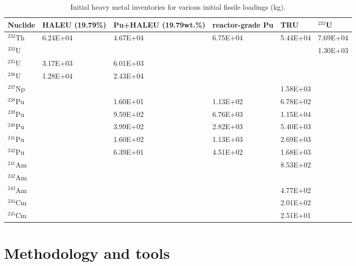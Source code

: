 \begin{table}  %
	\caption{Initial heavy metal inventories for 
	various initial fissile loadings (kg).}
	\vspace{0.1in}
	\begin{tabularx}{\textwidth}{X X p{} 
	p{} X X}
		\hline
		Nuclide & \gls{HALEU} (19.79\%) & Pu+\gls{HALEU} (19.79wt.\%) &  
		reactor-grade Pu & \gls{TRU}& $^{233}$U \\	\hline
		$^{232}$Th       &6.24E+04 & 4.67E+04 &   6.75E+04			& 5.44E+04	& 7.69E+04    \\ 
		$^{233}$U        &         & &        &       &  1.30E+03 \\
		$^{235}$U        & 3.17E+03 &6.01E+03	&            &   & \\
		$^{238}$U      	 &1.28E+04  &2.43E+04 &	&  &\\
		$^{237}$Np	  	 &         && &1.58E+03	&    \\
		$^{238}$Pu	  	 &         &1.60E+01	& 1.13E+02 & 6.78E+02	&   \\
		$^{239}$Pu       &         &9.59E+02&6.76E+03& 1.15E+04&    \\
		$^{240}$Pu       &         &3.99E+02& 2.82E+03&5.40E+03&  	\\  
		$^{241}$Pu		 &         &1.60E+02&1.13E+03&2.69E+03&   \\
		$^{242}$Pu		 &         &6.39E+01	&4.51E+02	& 1.68E+03& \\
		$^{241}$Am		 &         &&& 8.53E+02 & \\
		$^{242}$Am		 &         &&&  &\\
		$^{243}$Am       &        & &&4.77E+02&\\
		$^{244}$Cm		 &        & &&2.01E+02&  \\
		$^{245}$Cm		 &        & &&			2.51E+01	&   \\ 
		\hline
	\end{tabularx}
\label{tab:table5}
\end{table}


\section{Methodology and tools} \label{Methodology-and-tools}

